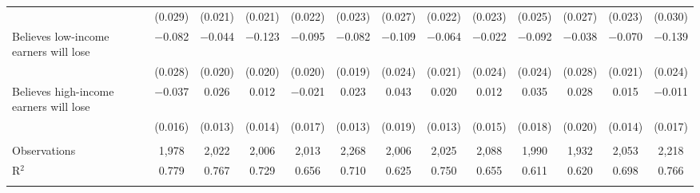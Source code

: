 \begin{tabular}{@{\extracolsep{5pt}}lcccccccccccc}
  & (0.029) & (0.021) & (0.021) & (0.022) & (0.023) & (0.027) & (0.022) & (0.023) & (0.025) & (0.027) & (0.023) & (0.030) \\ 
  Believes low-income earners will lose & $-$0.082 & $-$0.044 & $-$0.123 & $-$0.095 & $-$0.082 & $-$0.109 & $-$0.064 & $-$0.022 & $-$0.092 & $-$0.038 & $-$0.070 & $-$0.139 \\ 
  & (0.028) & (0.020) & (0.020) & (0.020) & (0.019) & (0.024) & (0.021) & (0.024) & (0.024) & (0.028) & (0.021) & (0.024) \\ 
  Believes high-income earners will lose & $-$0.037 & 0.026 & 0.012 & $-$0.021 & 0.023 & 0.043 & 0.020 & 0.012 & 0.035 & 0.028 & 0.015 & $-$0.011 \\ 
  & (0.016) & (0.013) & (0.014) & (0.017) & (0.013) & (0.019) & (0.013) & (0.015) & (0.018) & (0.020) & (0.014) & (0.017) \\ 
 \hline \\[-1.8ex] 

Observations & 1,978 & 2,022 & 2,006 & 2,013 & 2,268 & 2,006 & 2,025 & 2,088 & 1,990 & 1,932 & 2,053 & 2,218 \\ 
R$^{2}$ & 0.779 & 0.767 & 0.729 & 0.656 & 0.710 & 0.625 & 0.750 & 0.655 & 0.611 & 0.620 & 0.698 & 0.766 \\ 
\hline 
\hline \\[-1.8ex] 
\end{tabular} 